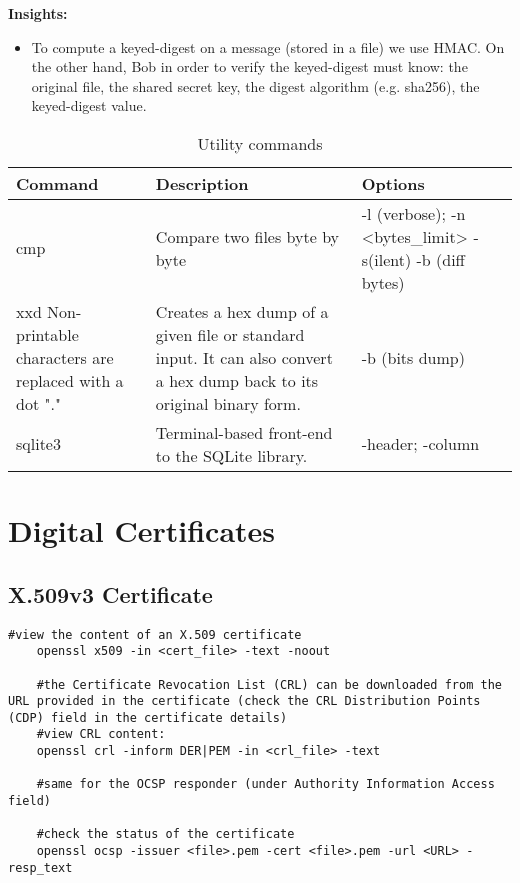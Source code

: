 \textbf{Insights:}
\begin{itemize}
    \item To compute a keyed-digest on a message (stored in a file) we use HMAC. On the other hand, Bob in order to verify the keyed-digest must know: the original file, the shared secret key, the digest algorithm (e.g. sha256), the keyed-digest value.
\end{itemize}

\begin{table}[H]
	\centering
    \begin{tabular}{|p{3cm}|p{6cm}|p{7cm}|}\hline
        \rowcolor{gray!30}
		\textbf{Command} & \textbf{Description} & \textbf{Options} \\ \hline
        cmp 
			& Compare two files byte by byte
			& -l (verbose); -n <bytes\_limit>
                \newline -s(ilent)
                \newline -b (diff bytes)
        \\ \hline

        xxd 
            \newline 
            \newline Non-printable characters are replaced with a dot "."
            & Creates  a  hex  dump of a given file or standard input.  It can also convert a hex dump back to its original binary form.
            & -b (bits dump)
        \\ \hline 

        sqlite3 
            & Terminal-based front-end to the SQLite library.
            & -header; -column
        \\ \hline


    \end{tabular}

    \caption{Utility commands}

\end{table}

\section{Digital Certificates}
\subsection{X.509v3 Certificate}

\begin{lstlisting}[style=bashStyle]
    #view the content of an X.509 certificate
    openssl x509 -in <cert_file> -text -noout

    #the Certificate Revocation List (CRL) can be downloaded from the URL provided in the certificate (check the CRL Distribution Points (CDP) field in the certificate details)
    #view CRL content:
    openssl crl -inform DER|PEM -in <crl_file> -text

    #same for the OCSP responder (under Authority Information Access field)

    #check the status of the certificate
    openssl ocsp -issuer <file>.pem -cert <file>.pem -url <URL> -resp_text
\end{lstlisting}

